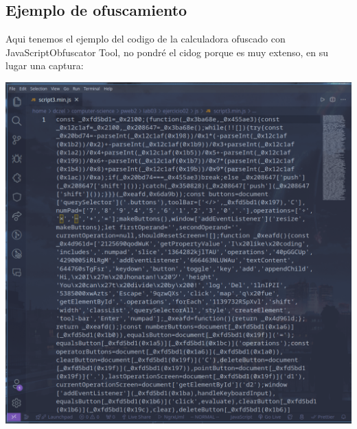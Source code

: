 \subsection{Ejemplo de ofuscamiento}
Aqui tenemos el ejemplo del codigo de la calculadora ofuscado con JavaScriptObfuscator Tool, no pondré el cidog porque es muy extenso, en su lugar una captura:

\includegraphics[width=1\textwidth]{./img/ofuscado.png}
